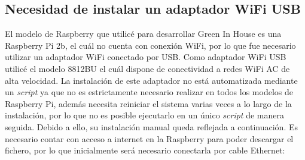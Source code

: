     \subsection{Necesidad de instalar un adaptador WiFi USB}  
    El modelo de Raspberry que utilicé para desarrollar Green In House es una Raspberry Pi 2b, el cuál no cuenta con conexión WiFi, por lo que fue necesario utilizar un adaptador WiFi conectado por USB. Como adaptador WiFi USB utilicé el modelo 8812BU el cuál dispone de conectividad a redes WiFi AC de alta velocidad. La instalación de este adaptador no está automatizada mediante un \textit{script} ya que no es estrictamente necesario realizar en todos los modelos de Raspberry Pi, además necesita reiniciar el sistema varias veces a lo largo de la instalación, por lo que no es posible ejecutarlo en un único \textit{script} de manera seguida. Debido a ello, su instalación manual queda reflejada a continuación. Es necesario contar con acceso a internet en la Raspberry para poder descargar el fichero, por lo que inicialmente será necesario conectarla por cable Ethernet:
